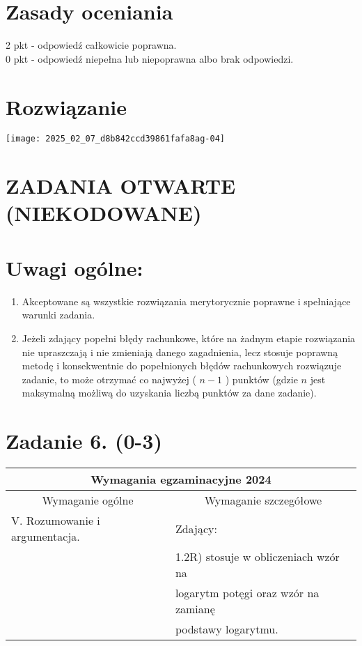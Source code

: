 \documentclass[10pt]{article}
\begin{document}
\section*{Zasady oceniania}
2 pkt - odpowiedź całkowicie poprawna.\\
0 pkt - odpowiedź niepełna lub niepoprawna albo brak odpowiedzi.

\section*{Rozwiązanie}
\begin{center}
\texttt{[image: 2025\_02\_07\_d8b842ccd39861fafa8ag-04]}
\end{center}

\section*{ZADANIA OTWARTE (NIEKODOWANE)}
\section*{Uwagi ogólne:}
\begin{enumerate}
  \item Akceptowane są wszystkie rozwiązania merytorycznie poprawne i spełniające warunki zadania.
  \item Jeżeli zdający popełni błędy rachunkowe, które na żadnym etapie rozwiązania nie upraszczają i nie zmieniają danego zagadnienia, lecz stosuje poprawną metodę i konsekwentnie do popełnionych błędów rachunkowych rozwiązuje zadanie, to może otrzymać co najwyżej ( $n-1$ ) punktów (gdzie $n$ jest maksymalną możliwą do uzyskania liczbą punktów za dane zadanie).
\end{enumerate}

\section*{Zadanie 6. (0-3)}
\begin{center}
\begin{tabular}{|l|l|}
\hline
\multicolumn{2}{|c|}{Wymagania egzaminacyjne 2024} \\
\hline
\multicolumn{1}{|c|}{Wymaganie ogólne} & \multicolumn{1}{c|}{Wymaganie szczegółowe} \\
\hline
V. Rozumowanie i argumentacja. & Zdający: \\
 & 1.2R) stosuje w obliczeniach wzór na \\
 & logarytm potęgi oraz wzór na zamianę \\
 & podstawy logarytmu. \\
\hline
\end{tabular}
\end{center}
\end{document}
